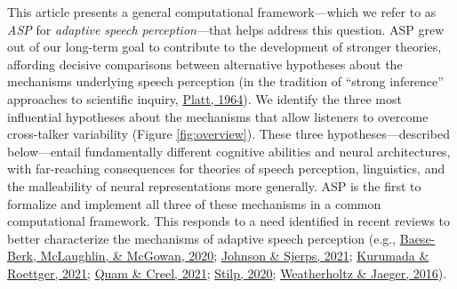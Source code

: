 \documentclass[
  11pt,
  english,
  man,floatsintext]{apa6}
\begin{document}
This article presents a general computational framework---which we refer to as \emph{ASP} for \emph{adaptive speech perception}---that helps address this question. ASP grew out of our long-term goal to contribute to the development of stronger theories, affording decisive comparisons between alternative hypotheses about the mechanisms underlying speech perception (in the tradition of {``strong inference''} approaches to scientific inquiry, \protect\hyperlink{ref-platt1964}{Platt, 1964}). We identify the three most influential hypotheses about the mechanisms that allow listeners to overcome cross-talker variability (Figure \ref{fig:overview}). These three hypotheses---described below---entail fundamentally different cognitive abilities and neural architectures, with far-reaching consequences for theories of speech perception, linguistics, and the malleability of neural representations more generally. ASP is the first to formalize and implement all three of these mechanisms in a common computational framework. This responds to a need identified in recent reviews to better characterize the mechanisms of adaptive speech perception (e.g., \protect\hyperlink{ref-baeseberk2020}{Baese-Berk, McLaughlin, \& McGowan, 2020}; \protect\hyperlink{ref-johnson-sjerps2021}{Johnson \& Sjerps, 2021}; \protect\hyperlink{ref-kurumada-roettger2021}{Kurumada \& Roettger, 2021}; \protect\hyperlink{ref-quam-creel2021}{Quam \& Creel, 2021}; \protect\hyperlink{ref-stilp2020}{Stilp, 2020}; \protect\hyperlink{ref-weatherholtz-jaeger2016}{Weatherholtz \& Jaeger, 2016}).
\end{document}
